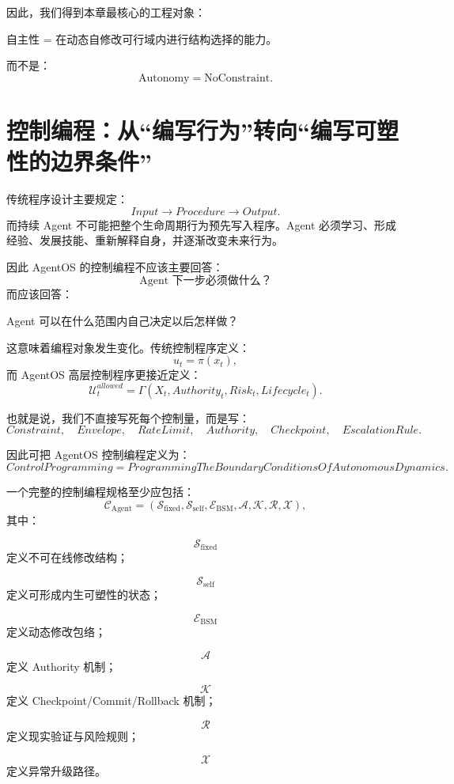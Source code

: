 因此，我们得到本章最核心的工程对象：
\begin{statementbox}
自主性 = 在动态自修改可行域内进行结构选择的能力。
\end{statementbox}

而不是：
\[
\text{Autonomy}=\text{NoConstraint}.
\]

\section{控制编程：从“编写行为”转向“编写可塑性的边界条件”}

传统程序设计主要规定：
\[
Input
\rightarrow
Procedure
\rightarrow
Output.
\]
而持续 Agent 不可能把整个生命周期行为预先写入程序。Agent 必须学习、形成经验、发展技能、重新解释自身，并逐渐改变未来行为。

因此 AgentOS 的控制编程不应该主要回答：
\[
\text{Agent 下一步必须做什么？}
\]
而应该回答：
\begin{statementbox}
Agent 可以在什么范围内自己决定以后怎样做？
\end{statementbox}

这意味着编程对象发生变化。传统控制程序定义：
\[
u_t=\pi(x_t),
\]
而 AgentOS 高层控制程序更接近定义：
\[
\boxed{
\mathcal U_t^{allowed}
=
\Gamma(
X_t,
Authority_t,
Risk_t,
Lifecycle_t
).
}
\]

也就是说，我们不直接写死每个控制量，而是写：
\[
Constraint,
\quad
Envelope,
\quad
RateLimit,
\quad
Authority,
\quad
Checkpoint,
\quad
EscalationRule.
\]

因此可把 AgentOS 控制编程定义为：
\[
\boxed{
ControlProgramming
=
ProgrammingTheBoundaryConditionsOfAutonomousDynamics.
}
\]

一个完整的控制编程规格至少应包括：
\[
\mathcal C_{\mathrm{Agent}}
=
(
\mathcal S_{\mathrm{fixed}},
\mathcal S_{\mathrm{self}},
\mathcal E_{\mathrm{BSM}},
\mathcal A,
\mathcal K,
\mathcal R,
\mathcal X
),
\]
其中：

\[
\mathcal S_{\mathrm{fixed}}
\]
定义不可在线修改结构；

\[
\mathcal S_{\mathrm{self}}
\]
定义可形成内生可塑性的状态；

\[
\mathcal E_{\mathrm{BSM}}
\]
定义动态修改包络；

\[
\mathcal A
\]
定义 Authority 机制；

\[
\mathcal K
\]
定义 Checkpoint/Commit/Rollback 机制；

\[
\mathcal R
\]
定义现实验证与风险规则；

\[
\mathcal X
\]
定义异常升级路径。

